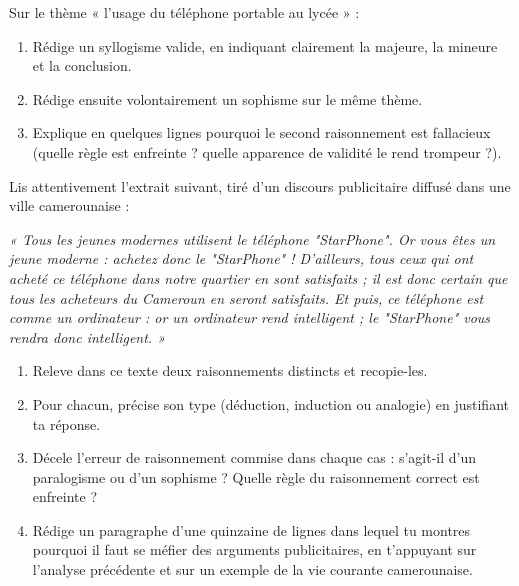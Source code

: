 \documentclass[11pt]{article}
\newcounter{popsec}
\newcounter{popsub}
\newcommand{\courssub}[1]{%
  \stepcounter{popsub}%
  \par\vspace{9pt}\noindent{\popxbold\fontsize{11.5}{13}\selectfont\color{popink}{\color{poporange}\thepopsec.\thepopsub}\hspace{6pt}#1}\par\nopagebreak\vspace{4pt}
}
\begin{document}
\begin{exercice}
Sur le thème « l'usage du téléphone portable au lycée » :
\begin{enumerate}
\item Rédige un syllogisme valide, en indiquant clairement la majeure, la mineure et la conclusion.
\item Rédige ensuite volontairement un sophisme sur le même thème.
\item Explique en quelques lignes pourquoi le second raisonnement est fallacieux (quelle règle est enfreinte ? quelle apparence de validité le rend trompeur ?).
\end{enumerate}
\end{exercice}

\courssub{Je me prépare au Bac}

\begin{exercice}
Lis attentivement l'extrait suivant, tiré d'un discours publicitaire diffusé dans une ville camerounaise :

\emph{« Tous les jeunes modernes utilisent le téléphone "StarPhone". Or vous êtes un jeune moderne : achetez donc le "StarPhone" ! D'ailleurs, tous ceux qui ont acheté ce téléphone dans notre quartier en sont satisfaits ; il est donc certain que tous les acheteurs du Cameroun en seront satisfaits. Et puis, ce téléphone est comme un ordinateur : or un ordinateur rend intelligent ; le "StarPhone" vous rendra donc intelligent. »}

\begin{enumerate}
\item Releve dans ce texte deux raisonnements distincts et recopie-les.
\item Pour chacun, précise son type (déduction, induction ou analogie) en justifiant ta réponse.
\item Décele l'erreur de raisonnement commise dans chaque cas : s'agit-il d'un paralogisme ou d'un sophisme ? Quelle règle du raisonnement correct est enfreinte ?
\item Rédige un paragraphe d'une quinzaine de lignes dans lequel tu montres pourquoi il faut se méfier des arguments publicitaires, en t'appuyant sur l'analyse précédente et sur un exemple de la vie courante camerounaise.
\end{enumerate}
\end{exercice}
\end{document}
